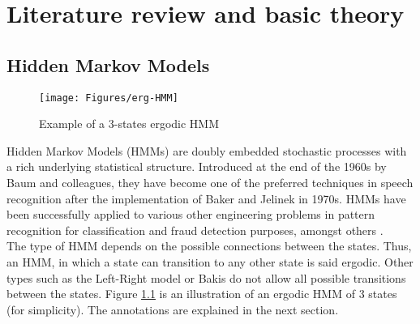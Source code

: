 \chapter{Literature review and basic theory} \label{chap:lit}

\section{Hidden Markov Models}
\begin{figure}[ht!]
	\centering
	\texttt{[image: Figures/erg-HMM]}
	\caption{Example of a 3-states ergodic HMM}{\cite{thes2011}}
	\label{fig:erg}
\end{figure}
Hidden Markov Models (HMMs) are doubly embedded stochastic processes with a rich underlying statistical structure. Introduced at the end of the 1960s by Baum and colleagues, they have become one of the preferred techniques in speech recognition after the implementation of Baker and Jelinek in 1970s. HMMs have been successfully applied to various other engineering problems in pattern recognition for classification and fraud detection purposes, amongst others \cite{tuto1989} \cite{tool2001} \cite{towa2009} \cite{twop2008}.\\
The type of HMM depends on the possible connections between the states. Thus, an HMM, in which a state can transition to any other state is said ergodic. Other types such as the Left-Right model or Bakis do not allow all possible transitions between the states. Figure \ref{fig:erg} is an illustration of an ergodic HMM of 3 states (for simplicity). The annotations are explained in the next section. 

